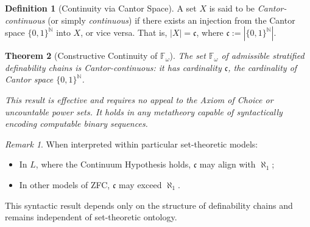 \documentclass[12pt]{article}
\theoremstyle{definition}
\newtheorem{definition}{Definition}[section]
\theoremstyle{plain}
\newtheorem{theorem}[definition]{Theorem}
\theoremstyle{remark}
\newtheorem*{remark}{Remark}
\begin{document}
\begin{definition}[Continuity via Cantor Space]
A set \( X \) is said to be \emph{Cantor-continuous} (or simply \emph{continuous}) if there exists an injection from the Cantor space \( \{0,1\}^\mathbb{N} \) into \( X \), or vice versa. That is, \( |X| = \mathfrak{c} \), where \( \mathfrak{c} := |\{0,1\}^\mathbb{N}| \).
\end{definition}

\begin{theorem}[Constructive Continuity of \( \mathbb{F}_\omega \)]
\label{thm:Fomega-continuity}
The set \( \mathbb{F}_\omega \) of admissible stratified definability chains is Cantor-continuous: it has cardinality \( \mathfrak{c} \), the cardinality of Cantor space \( \{0,1\}^\mathbb{N} \).

This result is effective and requires no appeal to the Axiom of Choice or uncountable power sets. It holds in any metatheory capable of syntactically encoding computable binary sequences.
\end{theorem}

\begin{remark}
When interpreted within particular set-theoretic models:
\begin{itemize}[nosep]
    \item[(i)] In \( L \), where the Continuum Hypothesis holds, \( \mathfrak{c} \) may align with \( \aleph_1 \);
    \item[(ii)] In other models of ZFC, \( \mathfrak{c} \) may exceed \( \aleph_1 \).
\end{itemize}
This syntactic result depends only on the structure of definability chains and remains independent of set-theoretic ontology.
\end{remark}
\end{document}
